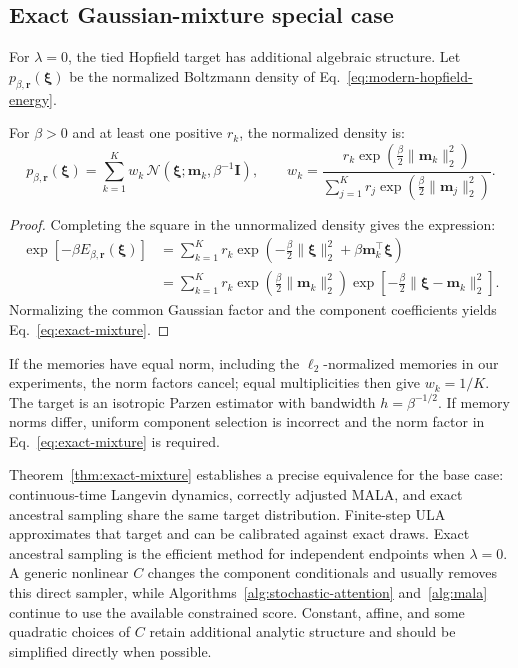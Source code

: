 \subsection{Exact Gaussian-mixture special case}

For $\lambda=0$, the tied Hopfield target has additional algebraic structure.
Let $p_{\beta,\mathbf r}(\boldsymbol\xi)$ be the normalized Boltzmann density of
Eq.~\eqref{eq:modern-hopfield-energy}.

\begin{theorem}
\label{thm:exact-mixture}
For $\beta>0$ and at least one positive $r_k$, the normalized density is:
\begin{equation}
p_{\beta,\mathbf r}(\boldsymbol\xi)
=\sum_{k=1}^K w_k\,
\mathcal N(\boldsymbol\xi;\mathbf m_k,\beta^{-1}\mathbf I),
\qquad
w_k=\frac{r_k\exp(\frac\beta2\lVert\mathbf m_k\rVert_2^2)}
{\sum_{j=1}^K r_j\exp(\frac\beta2\lVert\mathbf m_j\rVert_2^2)}.
\label{eq:exact-mixture}
\end{equation}
\end{theorem}

\begin{proof}
Completing the square in the unnormalized density gives the expression:
\begin{align}
\exp[-\beta E_{\beta,\mathbf r}(\boldsymbol\xi)]
&=\sum_{k=1}^K r_k
\exp\!\left(-\frac\beta2\lVert\boldsymbol\xi\rVert_2^2
+\beta\mathbf m_k^\top\boldsymbol\xi\right)\\
&=\sum_{k=1}^K r_k
\exp\!\left(\frac\beta2\lVert\mathbf m_k\rVert_2^2\right)
\exp\!\left[-\frac\beta2
\lVert\boldsymbol\xi-\mathbf m_k\rVert_2^2\right].
\end{align}
Normalizing the common Gaussian factor and the component coefficients yields
Eq.~\eqref{eq:exact-mixture}.
\end{proof}

If the memories have equal norm, including the $\ell_2$-normalized memories in
our experiments, the norm factors cancel; equal multiplicities then give
$w_k=1/K$. The target is an isotropic Parzen estimator with bandwidth
$h=\beta^{-1/2}$. If memory norms differ, uniform component selection is
incorrect and the norm factor in Eq.~\eqref{eq:exact-mixture} is required.

Theorem~\ref{thm:exact-mixture} establishes a precise equivalence for the base
case: continuous-time Langevin dynamics, correctly adjusted MALA, and exact
ancestral sampling share the same target distribution. Finite-step ULA
approximates that target and can be calibrated against exact draws. Exact
ancestral sampling is the efficient method for independent endpoints when
$\lambda=0$. A generic nonlinear $C$ changes the component conditionals and
usually removes this direct sampler, while Algorithms~\ref{alg:stochastic-attention}
and~\ref{alg:mala} continue to use the available constrained score. Constant,
affine, and some quadratic choices of $C$ retain additional analytic structure
and should be simplified directly when possible.

